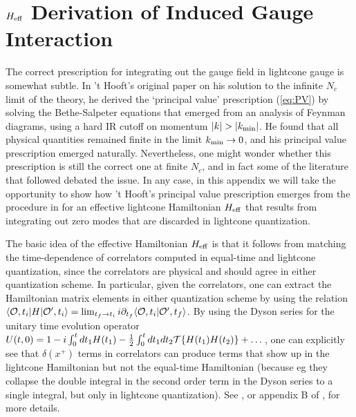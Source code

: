 \documentclass[12pt]{article}
\def\>{\rangle}
\def\<{\langle}
\newcommand{\CO}{{\cal O}}
\begin{document}
\section{$H_{\rm eff}$ Derivation of Induced Gauge Interaction}
\label{app:GaugeHeff}

The correct prescription for integrating out the gauge field in lightcone gauge is somewhat subtle.  In 't Hooft's original paper \cite{t1993two} on his solution to the infinite $N_c$ limit of the theory, he derived the `principal value' prescription (\ref{eq:PV}) by solving the Bethe-Salpeter equations that emerged from an analysis of Feynman diagrams, using a hard IR cutoff on momentum $|k| > |k_{\rm min}|$.  He found that all physical quantities remained finite  in the limit $k_{\rm min} \rightarrow 0$, and his principal value prescription emerged naturally.  Nevertheless, one might wonder whether this prescription is still the correct one at finite $N_c$, and in fact some of the literature that followed debated the issue.  In any case, in this appendix we will take the opportunity to show how 't Hooft's principal value prescription emerges from the procedure in \cite{Fitzpatrick:2018ttk} for an effective lightcone Hamiltonian $H_{\rm eff}$ that results from integrating out zero modes that are discarded in lightcone quantization.  

The basic idea of the effective Hamiltonian $H_{\rm eff}$ is that it follows from matching the time-dependence of correlators computed in equal-time and lightcone quantization, since the correlators are physical and should agree in either quantization scheme.  In particular, given the correlators, one can extract the Hamiltonian matrix elements in either quantization scheme by using the relation $\< \CO, t_i | H |  \CO', t_i\> = \lim_{t_f\rightarrow t_i} i \partial_{t_f} \< \CO, t_i | \CO', t_f\>$.   By using the Dyson series for the unitary time evolution operator $U(t,0) = 1 - i \int_0^t dt_1 H(t_1) -\frac{1}{2} \int_0^t dt_1 dt_2 {\cal T}\{ H(t_1) H(t_2) \} + \dots$, one can explicitly see that $\delta(x^+)$ terms in correlators can produce terms that show up in the lightcone Hamiltonian but not the equal-time Hamiltonian (because eg they collapse the double integral in the second order term in the Dyson series to a single integral, but only in lightcone quantization).  See \cite{Fitzpatrick:2018ttk}, or appendix B of \cite{Anand:2020gnn}, for more details.  
\end{document}
